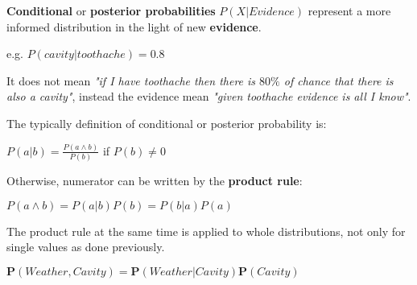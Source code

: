 \begin{definition}
    \textbf{Conditional} or \textbf{posterior probabilities} $P(X|Evidence)$ represent a more informed distribution in the light of new \textbf{evidence}. \vspace{3.5pt}

    e.g. $P(cavity|toothache) = 0.8$ \vspace{3.5pt}

    It does not mean \textit{"if I have toothache then there is $80\%$ of chance that there is also a cavity"}, instead the evidence mean \textit{"given toothache evidence is all I know"}. \vspace{3.5pt}

    The typically definition of conditional or posterior probability is: \vspace{3.5pt}

    \begin{center}
        $P(a|b) = \frac{P(a \land b)}{P(b)}$ if $P(b)\neq0$
    \end{center} \vspace{3.5pt}

    Otherwise, numerator can be written by the \textbf{product rule}: \vspace{3.5pt}
    
    \begin{center}
        $P(a \land b) = P(a|b)P(b) = P(b|a)P(a)$
    \end{center} \vspace{3.5pt}

    The product rule at the same time is applied to whole distributions, not only for single values as done previously. \vspace{3.5pt}
    
    \begin{center}
        $\mathbf{P}(Weather, Cavity) = \mathbf{P}(Weather|Cavity)\mathbf{P}(Cavity)$
    \end{center} \vspace{3.5pt}
\end{definition}
